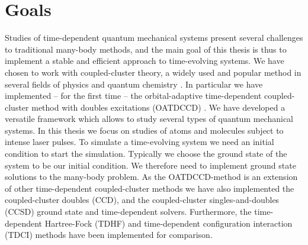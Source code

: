     \section{Goals}
        Studies of time-dependent quantum mechanical systems present several
        challenges to traditional many-body methods, and the main goal of this
        thesis is thus to implement a stable and efficient approach to
        time-evolving systems.
        We have chosen to work with coupled-cluster theory, a widely used and
        popular method in several fields of physics and quantum chemistry
        \cite{coester1958421, shavitt2009many, Hagen_2014, gauss1995coupled,
        lohne, kvaal2012ab, kvaal2013variational, hjorth2017advanced,
        helgaker-molecular}.
        In particular we have implemented -- for the first time -- the
        orbital-adaptive time-dependent coupled-cluster method with doubles
        excitations (OATDCCD) \cite{kvaal2012ab}.
        We have developed a versatile framework which allows to study several
        types of quantum mechanical systems.
        In this thesis we focus on studies of atoms and molecules subject to
        intense laser pulses.
        To simulate a time-evolving system we need an initial condition to start
        the simulation.
        Typically we choose the ground state of the system to be our initial
        condition.
        We therefore need to implement ground state solutions to the many-body
        problem.
        As the OATDCCD-method is an extension of other time-dependent
        coupled-cluster methods we have also implemented the coupled-cluster
        doubles (CCD), and the coupled-cluster singles-and-doubles (CCSD) ground
        state and time-dependent solvers.
        Furthermore, the time-dependent Hartree-Fock (TDHF) and time-dependent
        configuration interaction (TDCI) methods have been implemented for
        comparison.


